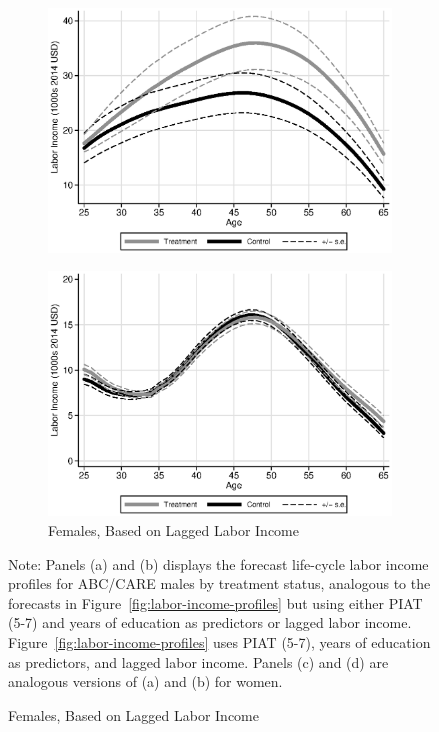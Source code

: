 \begin{figure}
\begin{subfigure}[h]{0.35\textwidth}
		\includegraphics[width=\textwidth]{output/labor_25-60_female_2}
\end{subfigure}%
\begin{subfigure}[h]{0.35\textwidth}
		\centering
		\caption{Females, Based on Lagged Labor Income}
		\includegraphics[width=\textwidth]{output/labor_25-60_female_3}
\end{subfigure}
\footnotesize \justify
Note: Panels (a) and (b) displays the forecast life-cycle labor income profiles for ABC/CARE males by treatment status, analogous to the forecasts in Figure~\ref{fig:labor-income-profiles} but using either PIAT (5-7) and years of education as predictors or lagged labor income. Figure~\ref{fig:labor-income-profiles} uses PIAT (5-7), years of education as predictors, and lagged labor income. Panels (c) and (d) are analogous versions of (a) and (b) for women.
\end{figure}

